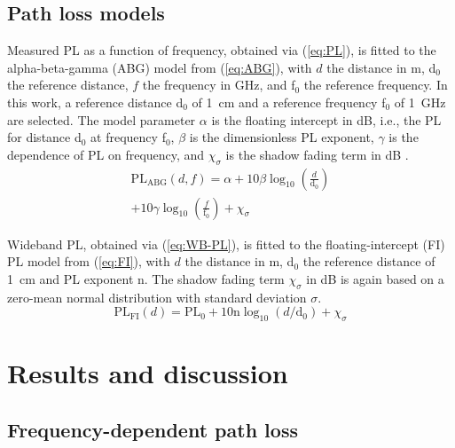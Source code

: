 \documentclass[preprint]{rsl}
\begin{document}
\subsection{Path loss models}

Measured PL as a function of frequency, obtained via (\ref{eq:PL}), is fitted to the alpha-beta-gamma (ABG) model from (\ref{eq:ABG}), with $d$ the distance in m, d$_0$ the reference distance, $f$ the frequency in GHz, and f$_0$ the reference frequency.  
In this work, a reference distance d$_0$ of 1~cm and a reference frequency f$_0$ of 1~GHz are selected.
The model parameter $\alpha$ is the floating intercept in dB, i.e., the PL for distance d$_0$ at frequency f$_0$, $\beta$ is the dimensionless PL exponent, $\gamma$ is the dependence of PL on frequency, and $\chi_{\sigma}$ is the shadow fading term in dB \cite{Salous2020}. 
\begin{multline}
  \text{PL}_{\text{ABG}}(d,f) = \alpha + 10 \beta \log_{10}\left(\frac{d}{\text{d}_0}\right) \\ + 10 \gamma \log_{10}\left(\frac{f}{ \text{f}_0}\right) + \chi_{\sigma}
  \label{eq:ABG}
\end{multline}

Wideband PL, obtained via (\ref{eq:WB-PL}), is fitted to the floating-intercept (FI) PL model from (\ref{eq:FI}), with $d$ the distance in m, d$_0$ the reference distance of 1~cm and PL exponent n. 
The shadow fading term $\chi_\sigma$ in dB is again based on a zero-mean normal distribution with standard deviation $\sigma$. 
\begin{equation}
  \text{PL}_{\text{FI}}(d) = \text{PL}_0 + 10 \text{n} \log_{10} (d/\text{d}_0) + \chi_\sigma
  \label{eq:FI}
\end{equation}

\section{Results and discussion\label{sect:results}}

\subsection{Frequency-dependent path loss}
\end{document}
